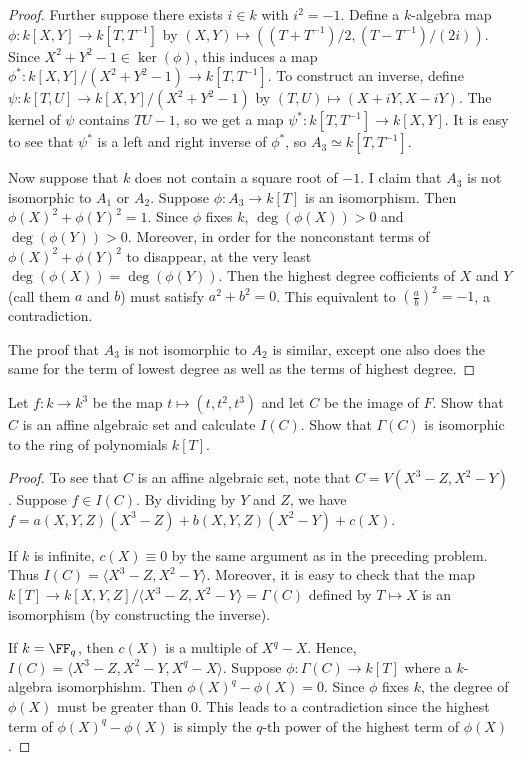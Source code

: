 \documentclass{article}
\begin{document}
\begin{proof}
Further suppose there exists $i \in k$ with $i^2 = -1$.  Define a $k$-algebra map $\phi: k[X,Y] \to k[T, T^{-1}]$ by 
$(X,Y) \mapsto ((T + T^{-1})/2, (T-T^{-1})/(2i))$. Since $X^2 + Y^2 -1 \in \ker(\phi)$, this induces a map $\phi^*: k[X,Y]/(X^2 + Y^2 - 1) \to k[T, T^{-1}]$.  To construct an inverse, define $\psi: k[T,U] \to k[X,Y]/(X^2 + Y^2 - 1)$ by $(T,U) \mapsto (X + iY, X - iY)$. The kernel of $\psi$ contains $TU - 1$, so we get a map  $\psi^*: k[T, T^{-1}] \to k[X,Y]$.  It is easy to see that $\psi^*$ is a left and right inverse of $\phi^*$, so $A_3 \simeq k[T,T^{-1}]$.

Now suppose that $k$ does not contain a square root of $-1$. I claim that $A_3$ is not isomorphic to $A_1$ or $A_2$.  Suppose $\phi:A_3 \to k[T]$ is an isomorphism. Then $\phi(X)^2 + \phi(Y)^2 = 1$.  Since $\phi$ fixes $k$, $\deg(\phi(X)) > 0$ and $\deg(\phi(Y)) > 0$.  Moreover, in order for the nonconstant terms of $\phi(X)^2 + \phi(Y)^2$ to disappear, at the very least $\deg(\phi(X)) = \deg(\phi(Y))$.  Then the highest degree cofficients of $X$ and $Y$ (call them $a$ and $b$) must satisfy $a^2 + b^2 = 0$. This equivalent to $\left(\frac a b\right)^2 = -1$, a contradiction.  

The proof that $A_3$ is not isomorphic to $A_2$ is similar, except one also does the same for the term of lowest degree as well as the terms of highest degree.
\end{proof}

 Let $f: k \to k^3$ be the map $t \mapsto (t, t^2, t^3)$ and let $C$ be the image of $F$. Show that $C$ is an affine algebraic set and calculate $I(C)$. Show that $\Gamma(C)$ is isomorphic to the ring of polynomials $k[T]$.
\begin{proof}
To see that $C$ is an affine algebraic set, note that $C = V(X^3 - Z, X^2 - Y)$. Suppose $f \in I(C)$.  By dividing by $Y$ and $Z$, we have $f = a(X,Y,Z)(X^3 - Z) + b(X,Y,Z)(X^2 - Y) + c(X)$.  

If $k$ is infinite, $c(X) \equiv 0$ by the same argument as in the preceding problem. Thus $I(C) =  \langle X^3 - Z, X^2 - Y \rangle$.  Moreover, it is easy to check that the map $k[T] \to k[X,Y,Z] / \langle X^3 - Z, X^2 - Y \rangle = \Gamma(C)$ defined by $T \mapsto X$ is an isomorphism (by constructing the inverse).

If $k = \FF_q$, then $c(X)$ is a multiple of $X^q - X$. Hence, $I(C) =  \langle X^3 - Z, X^2 - Y, X^q - X \rangle$. Suppose $\phi:\Gamma(C) \to k[T]$ where a $k$-algebra isomorphishm.  Then $\phi(X)^q - \phi(X) = 0$. Since $\phi$ fixes $k$, the degree of $\phi(X)$ must be greater than 0. This leads to a contradiction since the highest term of $\phi(X)^q - \phi(X)$ is simply the $q$-th power of the highest term of $\phi(X)$.
\end{proof}
\end{document}
